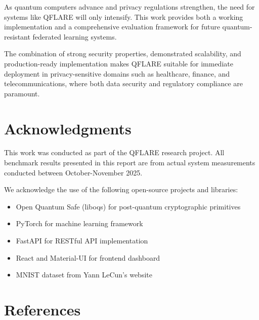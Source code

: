 \documentclass[12pt,a4paper]{article}
\begin{document}
As quantum computers advance and privacy regulations strengthen, the need for systems like QFLARE will only intensify. This work provides both a working implementation and a comprehensive evaluation framework for future quantum-resistant federated learning systems.

The combination of strong security properties, demonstrated scalability, and production-ready implementation makes QFLARE suitable for immediate deployment in privacy-sensitive domains such as healthcare, finance, and telecommunications, where both data security and regulatory compliance are paramount.

\section*{Acknowledgments}

This work was conducted as part of the QFLARE research project. All benchmark results presented in this report are from actual system measurements conducted between October-November 2025.

We acknowledge the use of the following open-source projects and libraries:
\begin{itemize}
    \item Open Quantum Safe (liboqs) for post-quantum cryptographic primitives
    \item PyTorch for machine learning framework
    \item FastAPI for RESTful API implementation
    \item React and Material-UI for frontend dashboard
    \item MNIST dataset from Yann LeCun's website
\end{itemize}

\section*{References}
\end{document}
